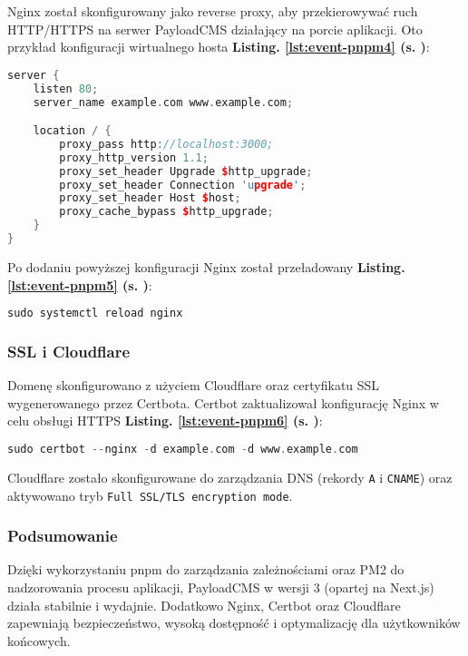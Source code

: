Nginx został skonfigurowany jako reverse proxy, aby przekierowywać ruch HTTP/HTTPS na serwer PayloadCMS działający na porcie aplikacji. Oto przykład konfiguracji wirtualnego hosta \textbf{Listing. \ref{lst:event-pnpm4} (s. \pageref{lst:event-pnpm4})}:
\begin{lstlisting}[language=C++, caption=Konfiguracja nginx,  label={lst:event-pnpm4}]
server {
    listen 80;
    server_name example.com www.example.com;

    location / {
        proxy_pass http://localhost:3000;
        proxy_http_version 1.1;
        proxy_set_header Upgrade $http_upgrade;
        proxy_set_header Connection 'upgrade';
        proxy_set_header Host $host;
        proxy_cache_bypass $http_upgrade;
    }
}
\end{lstlisting}

Po dodaniu powyższej konfiguracji Nginx został przeładowany \textbf{Listing. \ref{lst:event-pnpm5} (s. \pageref{lst:event-pnpm5})}:
\begin{lstlisting}[language=C++, caption=przeładowanie konfiguracji,  label={lst:event-pnpm5}]
sudo systemctl reload nginx
\end{lstlisting}

\subsubsection{SSL i Cloudflare}

Domenę skonfigurowano z użyciem Cloudflare oraz certyfikatu SSL wygenerowanego przez Certbota. Certbot zaktualizował konfigurację Nginx w celu obsługi HTTPS \textbf{Listing. \ref{lst:event-pnpm6} (s. \pageref{lst:event-pnpm6})}:
\begin{lstlisting}[language=C++, caption=Ustawienie cerbota,  label={lst:event-pnpm6}]
sudo certbot --nginx -d example.com -d www.example.com
\end{lstlisting}

Cloudflare zostało skonfigurowane do zarządzania DNS (rekordy \texttt{A} i \texttt{CNAME}) oraz aktywowano tryb \texttt{Full SSL/TLS encryption mode}.

\subsubsection{Podsumowanie}

Dzięki wykorzystaniu pnpm do zarządzania zależnościami oraz PM2 do nadzorowania procesu aplikacji, PayloadCMS w wersji 3 (opartej na Next.js) działa stabilnie i wydajnie. Dodatkowo Nginx, Certbot oraz Cloudflare zapewniają bezpieczeństwo, wysoką dostępność i optymalizację dla użytkowników końcowych.


